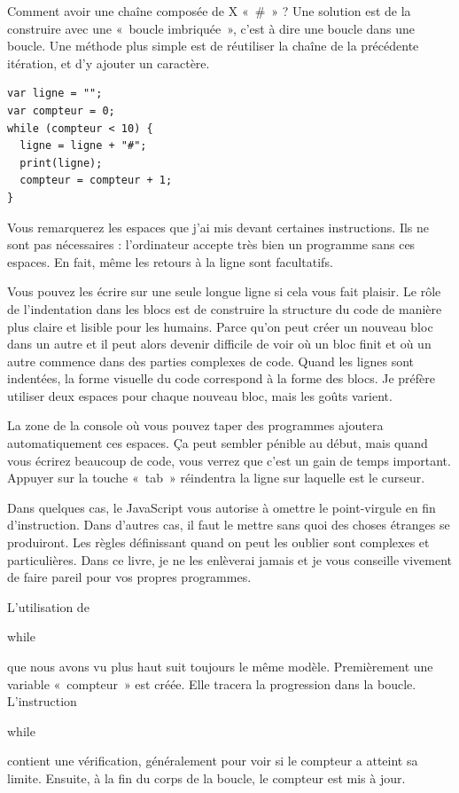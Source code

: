 \documentclass{FramateX}
\renewcommand{\texttt}[1]{\begin{sffamily}{#1}\end{sffamily}}
\begin{document}
Comment avoir une chaîne composée de X «~\#~» ? Une solution est de la
construire avec une «~boucle imbriquée~», c'est à dire une boucle dans
une boucle. Une méthode plus simple est de réutiliser la chaîne de la
précédente itération, et d'y ajouter un caractère.

\begin{lstlisting}
var ligne = "";
var compteur = 0;
while (compteur < 10) {
  ligne = ligne + "#";
  print(ligne);
  compteur = compteur + 1;
}
\end{lstlisting}
\begin{center}\end{center}

Vous remarquerez les espaces que j'ai mis devant certaines instructions.
Ils ne sont pas nécessaires : l'ordinateur accepte très bien un
programme sans ces espaces. En fait, même les retours à la ligne sont
facultatifs.

Vous pouvez les écrire sur une seule longue ligne si cela vous fait
plaisir. Le rôle de l'indentation dans les blocs est de construire la
structure du code de manière plus claire et lisible pour les humains.
Parce qu'on peut créer un nouveau bloc dans un autre et il peut alors
devenir difficile de voir où un bloc finit et où un autre commence dans
des parties complexes de code. Quand les lignes sont indentées, la forme
visuelle du code correspond à la forme des blocs. Je préfère utiliser
deux espaces pour chaque nouveau bloc, mais les goûts varient.

La zone de la console où vous pouvez taper des programmes ajoutera
automatiquement ces espaces. Ça peut sembler pénible au début, mais
quand vous écrirez beaucoup de code, vous verrez que c'est un gain de
temps important. Appuyer sur la touche «~tab~» réindentra la ligne sur
laquelle est le curseur.

Dans quelques cas, le JavaScript vous autorise à omettre le
point-virgule en fin d'instruction. Dans d'autres cas, il faut le mettre
sans quoi des choses étranges se produiront. Les règles définissant
quand on peut les oublier sont complexes et particulières. Dans ce
livre, je ne les enlèverai jamais et je vous conseille vivement de faire
pareil pour vos propres programmes.

\begin{center}\end{center}

L'utilisation de \texttt{while} que nous avons vu plus haut suit
toujours le même modèle. Premièrement une variable «~compteur~» est
créée. Elle tracera la progression dans la boucle. L'instruction
\texttt{while} contient une vérification, généralement pour voir si le
compteur a atteint sa limite. Ensuite, à la fin du corps de la boucle,
le compteur est mis à jour.
\end{document}
